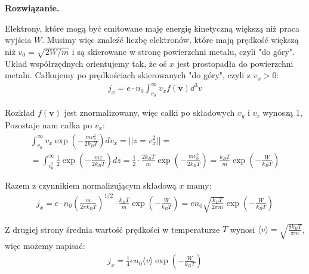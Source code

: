 \documentclass[11pt,a4paper]{article}
\newenvironment{solution}{\vspace{1cm} \par\textbf{Rozwiązanie.} \vspace{1cm}}{}
\begin{document}
\begin{solution}

Elektrony, które mogą być emitowane maję energię kinetyczną większą niż praca wyjścia $W$. 
Musimy więc znaleźć liczbę elektronów, które mają prędkość większą niż $v_0 = \sqrt{2W/m}$ i 
są skierowane w stronę powierzchni metalu, czyli "do góry". Układ współrzędnych orientujemy
tak, że oś $x$ jest prostopadła do powierzchni metalu.
Całkujemy po prędkościach skierowanych "do góry", czyli z $v_x > 0$:
\begin{align*}
  j_x = e \cdot n_{0} \int_{v_0}^\infty v_x f(\mathbf{v}) d^3v
\end{align*}

Rozkład $f(\mathbf{v})$ jest znormalizowany, więc całki po składowych $v_y$ i $v_z$ wynoszą 1, 
Pozostaje nam całka po $v_x$:
\begin{align*}
  \int_{v_0}^\infty v_x \exp\left( -\frac{m v_x^2}{2 k_B T} \right) dv_x = || z = v_{x}^2 || = \\
  = \int_{v_0^2}^\infty \frac{1}{2} \exp\left( -\frac{m z}{2 k_B T} \right) dz = 
   \frac{1}{2} \cdot \frac{2 k_B T}{m} \exp\left( -\frac{m v_0^2}{2 k_B T} \right) = \frac{k_B T}{m} \exp\left( -\frac{W}{k_B T} \right)
\end{align*}

Razem z czynnikiem normalizującym składową $x$ mamy:
\begin{align*}
  j_x = e \cdot n_{0} \left( \frac{m}{2\pi k_B T} \right)^{1/2} \cdot \frac{k_B T}{m} \exp\left( -\frac{W}{k_B T} \right) = e n_0 \sqrt{\frac{k_B T}{2\pi m}} \exp\left( -\frac{W}{k_B T} \right)
\end{align*}

Z drugiej strony średnia wartość prędkości w temperaturze $T$ wynosi 
$\langle v \rangle = \sqrt{\frac{8 k_B T}{\pi m}}$, więc możemy napisać:
\begin{align*}
  j_x = \frac{1}{4} e n_0 \langle v \rangle \exp\left( -\frac{W}{k_B T} \right)
\end{align*}

\newpage
\end{solution}
\end{document}
